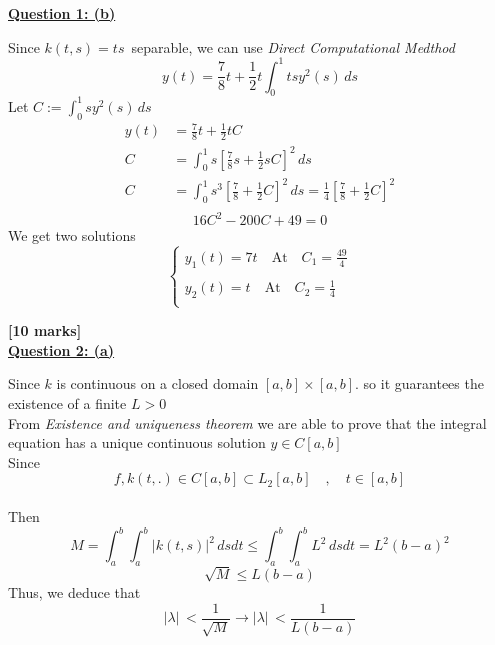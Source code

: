 \documentclass[]{article}
\begin{document}
\textbf{\underline{Question 1: (b)}}
\begin{adjustwidth}{1cm}{2cm}
    Since $k(t,s)=ts  \,$ separable, we can use \textit{Direct Computational Medthod}\\
    \begin{equation*}
        y(t) = \frac{7}{8}t + \frac{1}{2}t \int_0^1 ts y^2(s) \, ds
    \end{equation*}
    Let $\displaystyle C :=\int_0^1 s y^2(s) \, ds$
    \begin{align*}
        y(t) & = \frac{7}{8}t + \frac{1}{2}tC                                                                                       \\
        C    & = \int_0^1 s \left[\frac{7}{8}s + \frac{1}{2}sC\right]^2 \,ds                                                        \\
        C    & = \int_0^1 s^3 \left[\frac{7}{8} + \frac{1}{2}C\right]^2 \,ds = \frac{1}{4}\left[\frac{7}{8} + \frac{1}{2}C\right]^2 \\
    \end{align*}
    \begin{equation*}
        16C^2 -200C+49=0
    \end{equation*}
    We get two solutions
    \[
        \begin{cases}
            \displaystyle y_1(t) = 7t \quad \text{At} \quad C_1 = \frac{49}{4} \\\\
            \displaystyle y_2(t) = t \quad \text{At}  \quad C_2 = \frac{1}{4}  \\
        \end{cases}
    \]
\end{adjustwidth}
\textbf{[10 marks]}\\
\textbf{\underline{Question 2: (a)}}
\begin{adjustwidth}{1cm}{2cm}
    Since $k$ is continuous on a closed domain $[a,b]\times[a,b]$. so it guarantees the existence of a finite  $L>0$\\
    From \textit{Existence and uniqueness theorem} we are able to prove that the integral equation has a unique continuous solution $y\in C[a,b]$\\
    Since
    $$f,k(t,.) \in C[a,b] \subset L_2[a,b] \quad,\quad t \in [a,b]$$\\
    Then
    $$M = \int_a^b \int_a^b |k(t,s)|^2 \, ds dt \leq \int_a^b \int_a^b L^2 \, ds dt = L^2 (b-a)^2 $$
    $$\sqrt{M} \leq L(b-a)$$
    Thus, we deduce that
    $$|\lambda|\,< \frac{1}{\sqrt{M}} \rightarrow |\lambda|\,< \frac{1}{L(b-a)}$$
\end{adjustwidth}
\end{document}
